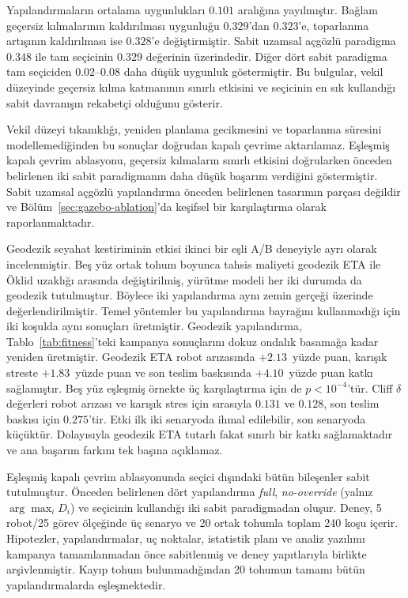\documentclass[10pt,letterpaper,onecolumn]{IEEEtran}
\begin{document}
Yapılandırmaların ortalama uygunlukları $0.101$ aralığına yayılmıştır. Bağlam
geçersiz kılmalarının kaldırılması uygunluğu $0.329$'dan $0.323$'e, toparlanma
artışının kaldırılması ise $0.328$'e değiştirmiştir. Sabit uzamsal açgözlü
paradigma $0.348$ ile tam seçicinin $0.329$ değerinin üzerindedir. Diğer dört
sabit paradigma tam seçiciden $0.02$--$0.08$ daha düşük uygunluk göstermiştir.
Bu bulgular, vekil düzeyinde geçersiz kılma katmanının sınırlı etkisini ve
seçicinin en sık kullandığı sabit davranışın rekabetçi olduğunu gösterir.

Vekil düzeyi tıkanıklığı, yeniden planlama gecikmesini ve toparlanma süresini
modellemediğinden bu sonuçlar doğrudan kapalı çevrime aktarılamaz. Eşleşmiş
kapalı çevrim ablasyonu, geçersiz kılmaların sınırlı etkisini doğrularken
önceden belirlenen iki sabit paradigmanın daha düşük başarım verdiğini
göstermiştir. Sabit uzamsal açgözlü yapılandırma önceden belirlenen tasarımın
parçası değildir ve Bölüm~\ref{sec:gazebo-ablation}'da keşifsel bir
karşılaştırma olarak raporlanmaktadır.

Geodezik seyahat kestiriminin etkisi ikinci bir eşli A/B deneyiyle ayrı olarak
incelenmiştir. Beş yüz ortak tohum boyunca tahsis maliyeti geodezik ETA ile
Öklid uzaklığı arasında değiştirilmiş, yürütme modeli her iki durumda da
geodezik tutulmuştur. Böylece iki yapılandırma aynı zemin gerçeği üzerinde
değerlendirilmiştir. Temel yöntemler bu yapılandırma bayrağını kullanmadığı için
iki koşulda aynı sonuçları üretmiştir. Geodezik yapılandırma,
Tablo~\ref{tab:fitness}'teki kampanya sonuçlarını dokuz ondalık basamağa kadar
yeniden üretmiştir. Geodezik ETA robot arızasında $+2.13$~yüzde puan, karışık
streste $+1.83$~yüzde puan ve son teslim baskısında $+4.10$~yüzde puan katkı
sağlamıştır. Beş yüz eşleşmiş örnekte üç karşılaştırma için de $p<10^{-4}$'tür.
Cliff $\delta$ değerleri robot arızası ve karışık stres için sırasıyla $0.131$
ve $0.128$, son teslim baskısı için $0.275$'tir. Etki ilk iki senaryoda ihmal
edilebilir, son senaryoda küçüktür. Dolayısıyla geodezik ETA tutarlı fakat
sınırlı bir katkı sağlamaktadır ve ana başarım farkını tek başına açıklamaz.

Eşleşmiş kapalı çevrim ablasyonunda seçici dışındaki bütün bileşenler sabit
tutulmuştur.
\label{sec:gazebo-ablation}
Önceden belirlenen dört yapılandırma \emph{full}, \emph{no-override} (yalnız
$\arg\max_i D_i$) ve seçicinin kullandığı iki sabit paradigmadan oluşur.
Deney, 5 robot/25 görev ölçeğinde üç senaryo ve 20 ortak tohumla toplam 240
koşu içerir. Hipotezler, yapılandırmalar, uç noktalar, istatistik planı ve
analiz yazılımı kampanya tamamlanmadan önce sabitlenmiş ve deney yapıtlarıyla
birlikte arşivlenmiştir. Kayıp tohum bulunmadığından 20 tohumun tamamı bütün
yapılandırmalarda eşleşmektedir.
\end{document}
